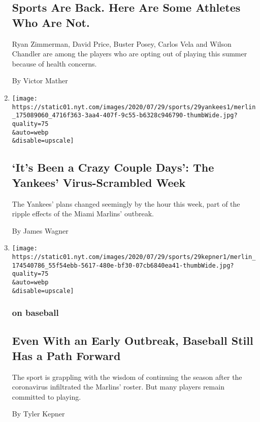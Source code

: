 \begin{enumerate}
  \hypertarget{sports-are-back-here-are-some-athletes-who-are-not}{%
  \subsection{Sports Are Back. Here Are Some Athletes Who Are
  Not.}\label{sports-are-back-here-are-some-athletes-who-are-not}}

  Ryan Zimmerman, David Price, Buster Posey, Carlos Vela and Wilson
  Chandler are among the players who are opting out of playing this
  summer because of health concerns.

  By Victor Mather
\item
  \href{/2020/07/29/sports/baseball/yankees-schedule.html}{}

  \texttt{[image: https://static01.nyt.com/images/2020/07/29/sports/29yankees1/merlin\_175089060\_4716f363-3aa4-407f-9c55-b6328c946790-thumbWide.jpg?quality=75\\\&auto=webp\\\&disable=upscale]}

  \hypertarget{its-been-a-crazy-couple-days-the-yankees-virus-scrambled-week}{%
  \subsection{`It's Been a Crazy Couple Days': The Yankees'
  Virus-Scrambled
  Week}\label{its-been-a-crazy-couple-days-the-yankees-virus-scrambled-week}}

  The Yankees' plans changed seemingly by the hour this week, part of
  the ripple effects of the Miami Marlins' outbreak.

  By James Wagner
\item
  \href{/2020/07/29/sports/baseball/mlb-season-coronavirus.html}{}

  \texttt{[image: https://static01.nyt.com/images/2020/07/29/sports/29kepner1/merlin\_174540786\_55f54ebb-5617-480e-bf30-07cb6840ea41-thumbWide.jpg?quality=75\\\&auto=webp\\\&disable=upscale]}

  \hypertarget{on-baseball}{%
  \subsubsection{on baseball}\label{on-baseball}}

  \hypertarget{even-with-an-early-outbreak-baseball-still-has-a-path-forward}{%
  \subsection{Even With an Early Outbreak, Baseball Still Has a Path
  Forward}\label{even-with-an-early-outbreak-baseball-still-has-a-path-forward}}

  The sport is grappling with the wisdom of continuing the season after
  the coronavirus infiltrated the Marlins' roster. But many players
  remain committed to playing.

  By Tyler Kepner
\end{enumerate}


